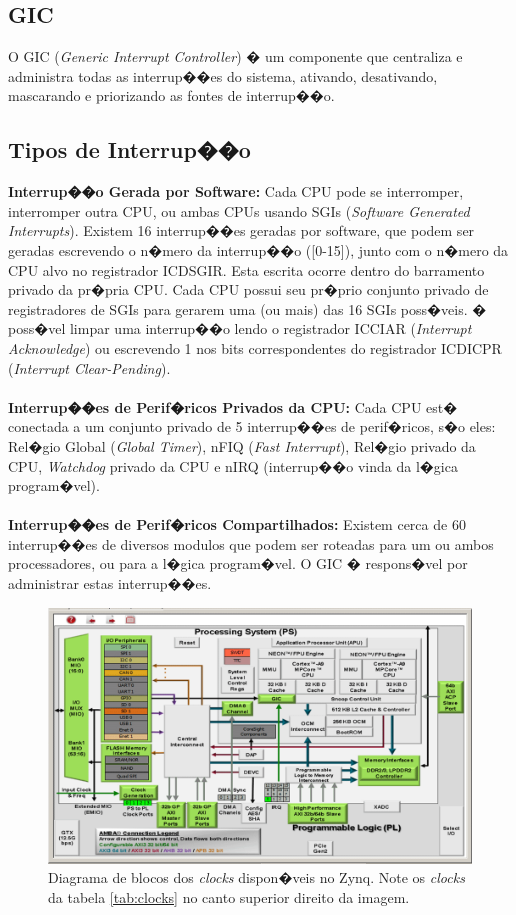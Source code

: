 \documentclass{ufscThesis/ufscThesis} %
\begin{document}
\subsection{GIC}
O GIC (\emph{Generic Interrupt Controller}) � um componente que centraliza e administra todas as interrup��es do sistema, ativando, desativando, mascarando e priorizando as fontes de interrup��o.


\subsection{Tipos de Interrup��o} %
\label{sec:interrupt}
\textbf{Interrup��o Gerada por Software: }
Cada CPU pode se interromper, interromper outra CPU, ou ambas CPUs usando SGIs (\emph{Software Generated Interrupts}). Existem 16 interrup��es geradas por software, que podem ser geradas escrevendo o n�mero da interrup��o ([0-15]), junto com o n�mero da CPU alvo no registrador ICDSGIR. Esta escrita ocorre dentro do barramento privado da pr�pria CPU. Cada CPU possui seu pr�prio conjunto privado de registradores de SGIs para gerarem uma (ou mais) das 16 SGIs poss�veis. � poss�vel limpar uma interrup��o lendo o registrador ICCIAR (\emph{Interrupt Acknowledge}) ou escrevendo 1 nos bits correspondentes do registrador ICDICPR (\emph{Interrupt Clear-Pending}).
\\\\
\textbf{Interrup��es de Perif�ricos Privados da CPU: }
Cada CPU est� conectada a um conjunto privado de 5 interrup��es de perif�ricos, s�o eles: Rel�gio Global (\emph{Global Timer}), nFIQ (\emph{Fast Interrupt}), Rel�gio privado da CPU, \emph{Watchdog} privado da CPU e nIRQ (interrup��o vinda da l�gica program�vel).
\\\\
\textbf{Interrup��es de Perif�ricos Compartilhados: }
Existem cerca de 60 interrup��es de diversos modulos que podem ser roteadas para um ou ambos processadores, ou para a l�gica program�vel. O GIC � respons�vel por administrar estas interrup��es.

\begin{figure}[ht!]
	\centerline{
    \includegraphics[width=13cm]{figuras/zynq-7000}
	}
    \caption{Diagrama de blocos dos \emph{clocks} dispon�veis no Zynq. Note os \emph{clocks} da tabela \ref{tab:clocks} no canto superior direito da imagem.}
\end{figure}
\end{document}
